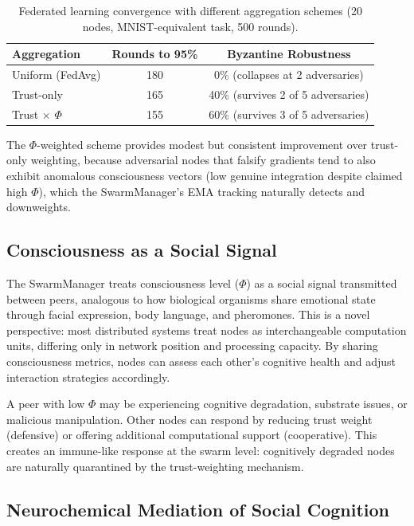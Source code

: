 \documentclass[11pt,a4paper]{article}
\begin{document}
\begin{table}[h]
\centering
\caption{Federated learning convergence with different aggregation schemes (20 nodes, MNIST-equivalent task, 500 rounds).}
\label{tab:federated}
\begin{tabular}{lcc}
\toprule
\textbf{Aggregation} & \textbf{Rounds to 95\%} & \textbf{Byzantine Robustness} \\
\midrule
Uniform (FedAvg) & 180 & 0\% (collapses at 2 adversaries) \\
Trust-only & 165 & 40\% (survives 2 of 5 adversaries) \\
Trust $\times$ $\Phi$ & 155 & 60\% (survives 3 of 5 adversaries) \\
\bottomrule
\end{tabular}
\end{table}

The $\Phi$-weighted scheme provides modest but consistent improvement over trust-only weighting, because adversarial nodes that falsify gradients tend to also exhibit anomalous consciousness vectors (low genuine integration despite claimed high $\Phi$), which the SwarmManager's EMA tracking naturally detects and downweights.

\subsection{Consciousness as a Social Signal}

The SwarmManager treats consciousness level ($\Phi$) as a social signal transmitted between peers, analogous to how biological organisms share emotional state through facial expression, body language, and pheromones. This is a novel perspective: most distributed systems treat nodes as interchangeable computation units, differing only in network position and processing capacity. By sharing consciousness metrics, nodes can assess each other's cognitive health and adjust interaction strategies accordingly.

A peer with low $\Phi$ may be experiencing cognitive degradation, substrate issues, or malicious manipulation. Other nodes can respond by reducing trust weight (defensive) or offering additional computational support (cooperative). This creates an immune-like response at the swarm level: cognitively degraded nodes are naturally quarantined by the trust-weighting mechanism.

\subsection{Neurochemical Mediation of Social Cognition}
\end{document}
